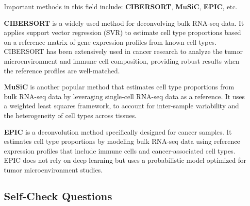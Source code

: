 \documentclass[a4paper]{article}
\begin{document}
Important methods in this field include: \textbf{CIBERSORT}, \textbf{MuSiC}, \textbf{EPIC}, etc.  

\textbf{CIBERSORT} is a widely used method for deconvolving bulk RNA-seq data. 
It applies support vector regression (SVR) to estimate cell type proportions based 
on a reference matrix of gene expression profiles from known cell types. 
CIBERSORT has been extensively used in cancer research to analyze the tumor microenvironment 
and immune cell composition, providing robust results when the reference profiles are well-matched.  

\textbf{MuSiC} is another popular method that estimates cell type proportions 
from bulk RNA-seq data by leveraging single-cell RNA-seq data as a reference. 
It uses a weighted least squares framework, to account for inter-sample variability and the heterogeneity of cell types across tissues.  

\textbf{EPIC} is a deconvolution method specifically designed for cancer samples. 
It estimates cell type proportions by modeling bulk RNA-seq data using reference expression profiles 
that include immune cells and cancer-associated cell types. 
EPIC does not rely on deep learning but uses a probabilistic model optimized for tumor microenvironment studies.  

\subsection*{Self-Check Questions}
\end{document}

